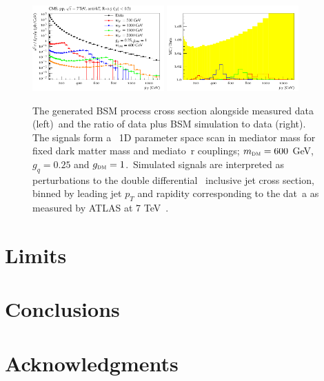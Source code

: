 \documentclass[floatfix]{article}
\begin{document}
\begin{figure}[!htb]
\begin{center}

\includegraphics[width=0.45\textwidth]{images/CMS_incl_jet.pdf}
\includegraphics[width=0.45\textwidth]{images/CMS_incljets_ratio.pdf}

\caption{The generated BSM process cross section alongside measured data (left)\
 and the ratio of data plus BSM simulation to data (right). The signals form a \
1D parameter space scan in mediator mass for fixed dark matter mass and mediato\
r couplings; $m_{\textsc{dm}}=600$ GeV, $g_{q}=0.25$ and $g_{\textsc{dm}} = 1$.\
 Simulated signals are interpreted as perturbations to the double differential \
inclusive jet cross section, binned by leading jet $p_{T}$ and rapidity corresponding to the dat\
a as measured by ATLAS at 7 TeV~\cite{Chatrchyan:2014gia}.}
\label{fig:CMSincljet}
\end{center}
\end{figure}


\section{Limits}\label{sec:limits}

\section{Conclusions}\label{sec:conclusions}

\section*{Acknowledgments}





\end{document}
